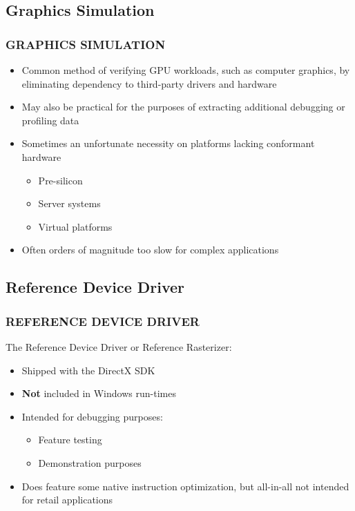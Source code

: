 \subsection{Graphics Simulation}
\begin{frame}
\frametitle{GRAPHICS SIMULATION}

\begin{itemize}
\item Common method of verifying GPU workloads, such as computer graphics, by eliminating dependency to third-party drivers and hardware
\item May also be practical for the purposes of extracting additional debugging or profiling data
\item Sometimes an unfortunate necessity on platforms lacking conformant hardware
  \begin{itemize}
  \item Pre-silicon
  \item Server systems
  \item Virtual platforms
  \end{itemize}
\item Often orders of magnitude too slow for complex applications
\end{itemize}

\end{frame}

\subsection{Reference Device Driver}
\begin{frame}
\frametitle{REFERENCE DEVICE DRIVER}

The Reference Device Driver or Reference Rasterizer:
\begin{itemize}
\item Shipped with the DirectX SDK
\item \textbf{Not} included in Windows run-times
\item Intended for debugging purposes:
  \begin{itemize}
  \item Feature testing
  \item Demonstration purposes
  \end{itemize}
\item Does feature some native instruction optimization, but all-in-all not intended for retail applications
\end{itemize}

\end{frame}

